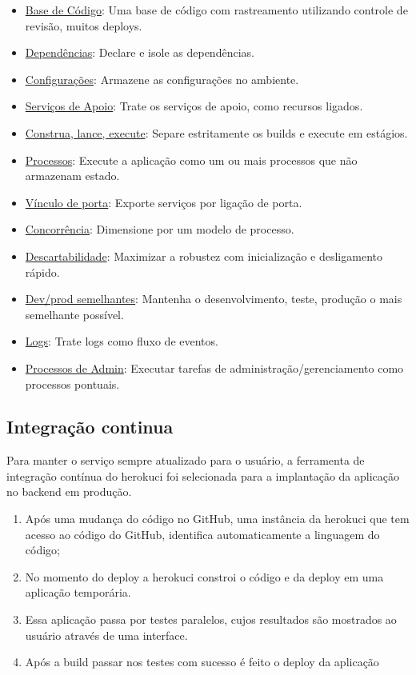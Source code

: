 \begin{itemize}
    \item \underline{Base de Código}: Uma base de código com rastreamento utilizando controle de revisão, muitos deploys.
    \item \underline{Dependências}: Declare e isole as dependências.
    \item \underline{Configurações}: Armazene as configurações no ambiente.
    \item \underline{Serviços de Apoio}: Trate os serviços de apoio, como recursos ligados.
    \item \underline{Construa, lance, execute}: Separe estritamente os builds e execute em estágios.
    \item \underline{Processos}: Execute a aplicação como um ou mais processos que não armazenam estado.
    \item \underline{Vínculo de porta}: Exporte serviços por ligação de porta.
    \item \underline{Concorrência}: Dimensione por um modelo de processo.
    \item \underline{Descartabilidade}: Maximizar a robustez com inicialização e desligamento rápido.
    \item \underline{Dev/prod semelhantes}: Mantenha o desenvolvimento, teste, produção o mais semelhante possível.
    \item \underline{Logs}: Trate logs como fluxo de eventos.
    \item \underline{Processos de Admin}: Executar tarefas de administração/gerenciamento como processos pontuais.
\end{itemize}

\subsection{Integração continua}
Para manter o serviço sempre atualizado para o usuário, a ferramenta de integração contínua do \gls{herokuci} foi selecionada para a implantação da aplicação no \gls{backend} em produção.

\begin{enumerate}
    \item Após uma mudança do código no GitHub, uma instância da \gls{herokuci} que tem acesso ao código do GitHub, identifica automaticamente
    a linguagem do código; 
    \item No momento do \gls{deploy} a \gls{herokuci} constroi o código e da \gls{deploy} em uma aplicação temporária.
    \item Essa aplicação passa por testes paralelos, cujos resultados são mostrados ao usuário através de uma interface.
    \item Após a build passar nos testes com sucesso é feito o \gls{deploy} da aplicação 
\end{enumerate}

